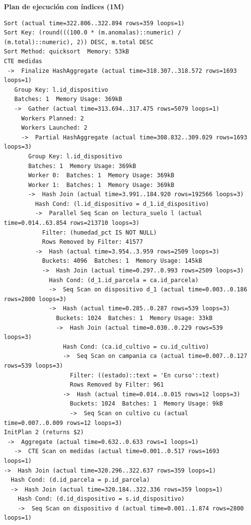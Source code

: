\documentclass[11pt,letterpaper]{article}
\begin{document}
\textbf{Plan de ejecución con índices (1M)}
\begin{lstlisting}[style=plano]
Sort (actual time=322.806..322.894 rows=359 loops=1)
Sort Key: (round(((100.0 * (m.anomalas)::numeric) / (m.total)::numeric), 2)) DESC, m.total DESC
Sort Method: quicksort  Memory: 53kB
CTE medidas
 ->  Finalize HashAggregate (actual time=318.307..318.572 rows=1693 loops=1)
   Group Key: l.id_dispositivo
   Batches: 1  Memory Usage: 369kB
   ->  Gather (actual time=313.694..317.475 rows=5079 loops=1)
     Workers Planned: 2
     Workers Launched: 2
     ->  Partial HashAggregate (actual time=308.832..309.029 rows=1693 loops=3)
       Group Key: l.id_dispositivo
       Batches: 1  Memory Usage: 369kB
       Worker 0:  Batches: 1  Memory Usage: 369kB
       Worker 1:  Batches: 1  Memory Usage: 369kB
       ->  Hash Join (actual time=3.991..184.920 rows=192566 loops=3)
         Hash Cond: (l.id_dispositivo = d_1.id_dispositivo)
         ->  Parallel Seq Scan on lectura_suelo l (actual time=0.014..63.854 rows=213710 loops=3)
           Filter: (humedad_pct IS NOT NULL)
           Rows Removed by Filter: 41577
         ->  Hash (actual time=3.954..3.959 rows=2509 loops=3)
           Buckets: 4096  Batches: 1  Memory Usage: 145kB
           ->  Hash Join (actual time=0.297..0.993 rows=2509 loops=3)
             Hash Cond: (d_1.id_parcela = ca.id_parcela)
             ->  Seq Scan on dispositivo d_1 (actual time=0.003..0.186 rows=2800 loops=3)
             ->  Hash (actual time=0.285..0.287 rows=539 loops=3)
               Buckets: 1024  Batches: 1  Memory Usage: 33kB
               ->  Hash Join (actual time=0.030..0.229 rows=539 loops=3)
                 Hash Cond: (ca.id_cultivo = cu.id_cultivo)
                 ->  Seq Scan on campania ca (actual time=0.007..0.127 rows=539 loops=3)
                   Filter: ((estado)::text = 'En curso'::text)
                   Rows Removed by Filter: 961
                 ->  Hash (actual time=0.014..0.015 rows=12 loops=3)
                   Buckets: 1024  Batches: 1  Memory Usage: 9kB
                   ->  Seq Scan on cultivo cu (actual time=0.007..0.009 rows=12 loops=3)
InitPlan 2 (returns $2)
 ->  Aggregate (actual time=0.632..0.633 rows=1 loops=1)
   ->  CTE Scan on medidas (actual time=0.001..0.517 rows=1693 loops=1)
->  Hash Join (actual time=320.296..322.637 rows=359 loops=1)
  Hash Cond: (d.id_parcela = p.id_parcela)
  ->  Hash Join (actual time=320.184..322.336 rows=359 loops=1)
    Hash Cond: (d.id_dispositivo = s.id_dispositivo)
    ->  Seq Scan on dispositivo d (actual time=0.001..1.874 rows=2800 loops=1)

\end{lstlisting}
\end{document}
